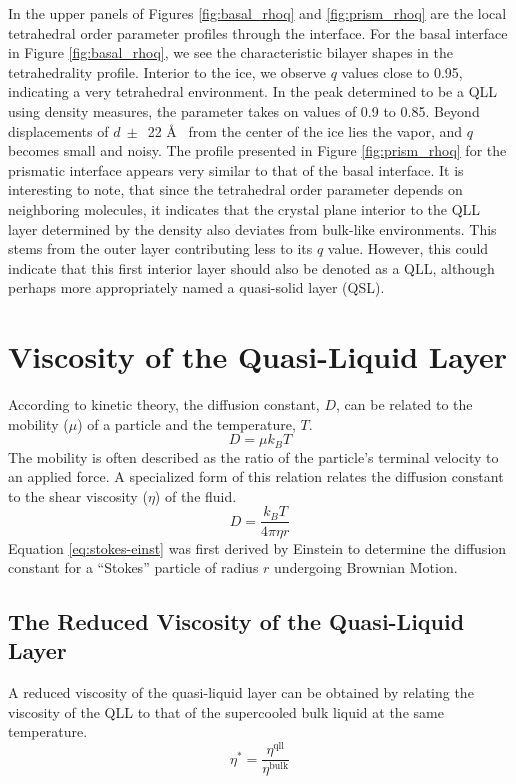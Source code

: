 In the upper panels of Figures \ref{fig:basal_rhoq} and
\ref{fig:prism_rhoq} are the local tetrahedral order parameter
profiles through the interface. For the basal interface in Figure
\ref{fig:basal_rhoq}, we see the characteristic bilayer shapes in the
tetrahedrality profile. Interior to the ice, we observe $q$ values
close to 0.95, indicating a very tetrahedral environment. In the peak
determined to be a QLL using density measures, the parameter takes on
values of 0.9 to 0.85. Beyond displacements of $d~\pm$~22 \AA~ from
the center of the ice lies the vapor, and $q$ becomes small and
noisy. The profile presented in Figure \ref{fig:prism_rhoq} for the
prismatic interface appears very similar to that of the basal
interface. It is interesting to note, that since the tetrahedral order
parameter depends on neighboring molecules, it indicates that the
crystal plane interior to the QLL layer determined by the density also
deviates from bulk-like environments. This stems from the outer layer
contributing less to its $q$ value. However, this could indicate that
this first interior layer should also be denoted as a QLL, although
perhaps more appropriately named a quasi-solid layer (QSL).


\section{Viscosity of the Quasi-Liquid Layer}

According to kinetic theory, the diffusion constant, $D$, can be
related to the mobility ($\mu$) of a particle and the temperature,
$T$.
\begin{equation}
D = \mu k_B T
\end{equation}
The mobility is often described as the ratio of the particle's
terminal velocity to an applied force. A specialized form of
this relation relates the diffusion constant to the shear viscosity
($\eta$) of the fluid.
\begin{equation}\label{eq:stokes-einst}
D = \frac{k_BT}{4\pi \eta r}
\end{equation}
Equation \eqref{eq:stokes-einst} was first derived by Einstein to
determine the diffusion constant for a ``Stokes'' particle of radius
$r$ undergoing Brownian Motion. 

\subsection{The Reduced Viscosity of the Quasi-Liquid Layer}
A reduced viscosity of the quasi-liquid layer can be obtained by
relating the viscosity of the QLL to that of the supercooled bulk
liquid at the same temperature.
\begin{equation}\label{eq:eta*}
\eta^* = \frac{\eta^{\mathrm{qll}}}{\eta^{\mathrm{bulk}}}
\end{equation}

